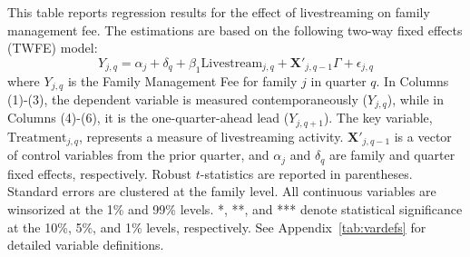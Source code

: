 \begin{table}[!ht]
    \centering
    
    \caption{Dynamic Livestream Effect on Family Management Fee}\label{tab:family_twfe_managementfee_reallocation}
    
    \begin{minipage}{0.95\textwidth}
        \footnotesize
        This table reports regression results for the effect of livestreaming on family management fee. The estimations are based on the following two-way fixed effects (TWFE) model:
        \begin{equation*}
            Y_{j,q} = \alpha_j + \delta_q + \beta_1 \text{Livestream}_{j,q} + \mathbf{X}'_{j,q-1} \Gamma + \epsilon_{j,q}
        \end{equation*}
        where $Y_{j,q}$ is the Family Management Fee for family $j$ in quarter $q$. In Columns (1)-(3), the dependent variable is measured contemporaneously ($Y_{j,q}$), while in Columns (4)-(6), it is the one-quarter-ahead lead ($Y_{j,q+1}$). The key variable, $\text{Treatment}_{j,q}$, represents a measure of livestreaming activity. $\mathbf{X}'_{j,q-1}$ is a vector of control variables from the prior quarter, and $\alpha_j$ and $\delta_q$ are family and quarter fixed effects, respectively. Robust $t$-statistics are reported in parentheses. Standard errors are clustered at the family level. All continuous variables are winsorized at the 1\% and 99\% levels. *, **, and *** denote statistical significance at the 10\%, 5\%, and 1\% levels, respectively. See Appendix~\ref{tab:vardefs} for detailed variable definitions. %
    \end{minipage}

    \vspace{2mm}

     
    
\end{table}